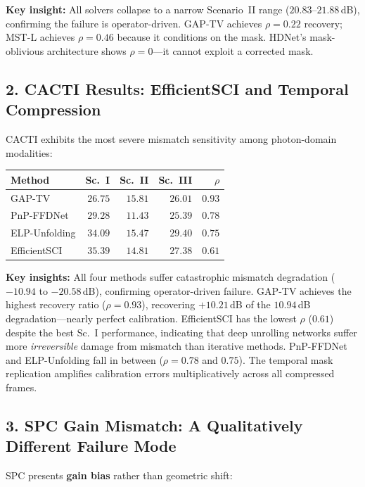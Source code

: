 \documentclass[11pt]{article}
\begin{document}
\noindent\textbf{Key insight:} All solvers collapse to a narrow Scenario~II range ($20.83$--$21.88$\,dB), confirming the failure is operator-driven.  GAP-TV achieves $\rho = 0.22$ recovery; MST-L achieves $\rho = 0.46$ because it conditions on the mask.  HDNet's mask-oblivious architecture shows $\rho = 0$---it cannot exploit a corrected mask.

\subsection*{2. CACTI Results: EfficientSCI and Temporal Compression}

CACTI exhibits the most severe mismatch sensitivity among photon-domain modalities:

\begin{center}
\begin{tabular}{lrrrr}
\toprule
\textbf{Method} & \textbf{Sc.~I} & \textbf{Sc.~II} & \textbf{Sc.~III} & \textbf{$\rho$} \\
\midrule
GAP-TV        & $26.75$ & $15.81$ & $26.01$ & $0.93$ \\
PnP-FFDNet    & $29.28$ & $11.43$ & $25.39$ & $0.78$ \\
ELP-Unfolding & $34.09$ & $15.47$ & $29.40$ & $0.75$ \\
EfficientSCI  & $35.39$ & $14.81$ & $27.38$ & $0.61$ \\
\bottomrule
\end{tabular}
\end{center}

\noindent\textbf{Key insights:} All four methods suffer catastrophic mismatch degradation ($-10.94$ to $-20.58$\,dB), confirming operator-driven failure.  GAP-TV achieves the highest recovery ratio ($\rho = 0.93$), recovering $+10.21$\,dB of the $10.94$\,dB degradation---nearly perfect calibration.  EfficientSCI has the lowest $\rho$ ($0.61$) despite the best Sc.~I performance, indicating that deep unrolling networks suffer more \emph{irreversible} damage from mismatch than iterative methods.  PnP-FFDNet and ELP-Unfolding fall in between ($\rho = 0.78$ and $0.75$).  The temporal mask replication amplifies calibration errors multiplicatively across all compressed frames.

\subsection*{3. SPC Gain Mismatch: A Qualitatively Different Failure Mode}

SPC presents \textbf{gain bias} rather than geometric shift:
\end{document}
